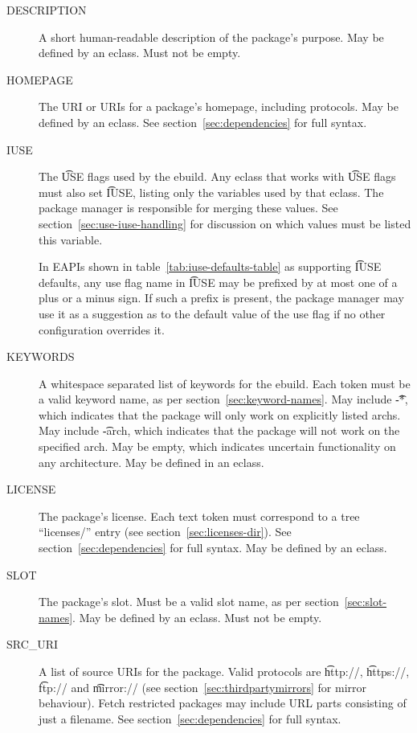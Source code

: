 \begin{description}
\item[DESCRIPTION] A short human-readable description of the package's purpose. May be defined by an
    eclass. Must not be empty.
\item[HOMEPAGE] The URI or URIs for a package's homepage, including protocols. May be defined by an
    eclass. See section~\ref{sec:dependencies} for full syntax.
\item[IUSE] The \t{USE} flags used by the ebuild. Any eclass that works with \t{USE} flags
    must also set \t{IUSE}, listing only the variables used by that eclass. The package manager is
    responsible for merging these values. See section~\ref{sec:use-iuse-handling} for discussion on
    which values must be listed this variable.

    In EAPIs shown in table~\ref{tab:iuse-defaults-table} as supporting \t{IUSE} defaults, any use flag
    name in \t{IUSE} may be prefixed by at most one of a plus or a minus sign. If such a prefix is
    present, the package manager may use it as a suggestion as to the default value of the use flag
    if no other configuration overrides it.
\item[KEYWORDS] A whitespace separated list of keywords for the ebuild. Each token must be a
    valid keyword name, as per section~\ref{sec:keyword-names}. May include \t{-*}, which
    indicates that the package will only work on explicitly listed archs. May include \t{-arch},
    which indicates that the package will not work on the specified arch. May be empty, which
    indicates uncertain functionality on any architecture. May be defined in an eclass.
\item[LICENSE] The package's license. Each text token must correspond to a tree ``licenses/'' entry
    (see section~\ref{sec:licenses-dir}). See section~\ref{sec:dependencies} for full syntax.
    May be defined by an eclass. \label{ebuild-var-LICENSE}
\item[SLOT] The package's slot. Must be a valid slot name, as per section~\ref{sec:slot-names}. May
    be defined by an eclass. Must not be empty.
\item[SRC\_URI] A list of source URIs for the package. Valid protocols are \t{http://},
    \t{https://}, \t{ftp://} and \t{mirror://} (see section~\ref{sec:thirdpartymirrors} for mirror behaviour).
    Fetch restricted packages may include URL parts consisting of just a filename. See
    section~\ref{sec:dependencies} for full syntax.
\end{description}

